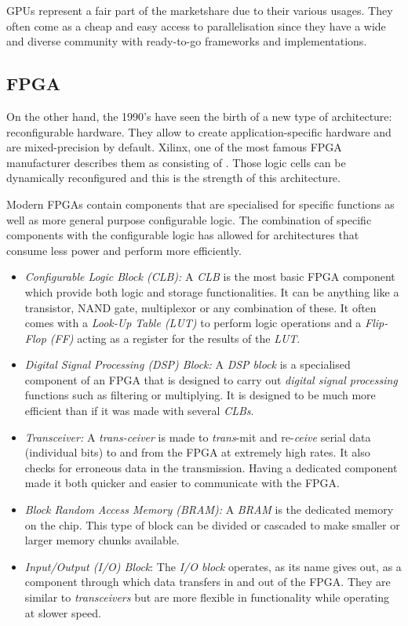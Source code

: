 GPUs represent a fair part of the marketshare due to their various usages. They often come as a cheap and easy access to parallelisation since they have a wide and diverse community with ready-to-go frameworks and implementations.


\subsection{FPGA}

On the other hand, the 1990's have seen the birth of a new type of architecture: reconfigurable hardware. They allow to create application-specific hardware and are mixed-precision by default. Xilinx, one of the most famous FPGA manufacturer describes them as consisting of  \cite{Xilinx2017}. Those logic cells can be dynamically reconfigured and this is the strength of this architecture.

Modern FPGAs contain components that are specialised for specific functions as well as more general purpose configurable logic. The combination of specific components with the configurable logic has allowed for architectures that consume less power and perform more efficiently.
\begin{itemize}
  \item \emph{Configurable Logic Block (CLB):} A \emph{CLB} is the most basic FPGA component which provide both logic and storage functionalities. It can be anything like a transistor, NAND gate, multiplexor or any combination of these. It often comes with a \emph{Look-Up Table (LUT)} to perform logic operations and a \emph{Flip-Flop (FF)} acting as a register for the results of the \emph{LUT}.
  \item \emph{Digital Signal Processing (DSP) Block:} A \emph{DSP block} is a specialised component of an FPGA that is designed to carry out \emph{digital signal processing} functions such as filtering or multiplying. It is designed to be much more efficient than if it was made with several \emph{CLBs}.
  \item \emph{Transceiver:} A \emph{trans-ceiver} is made to \emph{trans}-mit and re-\emph{ceive} serial data (individual bits) to and from the FPGA at extremely high rates. It also checks for erroneous data in the transmission. Having a dedicated component made it both quicker and easier to communicate with the FPGA.
  \item \emph{Block Random Access Memory (BRAM):} A \emph{BRAM} is the dedicated memory on the chip. This type of block can be divided or cascaded to make smaller or larger memory chunks available.
  \item \emph{Input/Output (I/O) Block}: The \emph{I/O block} operates, as its name gives out, as a component through which data transfers in and out of the FPGA. They are similar to \emph{transceivers} but are more flexible in functionality while operating at slower speed.
\end{itemize}

